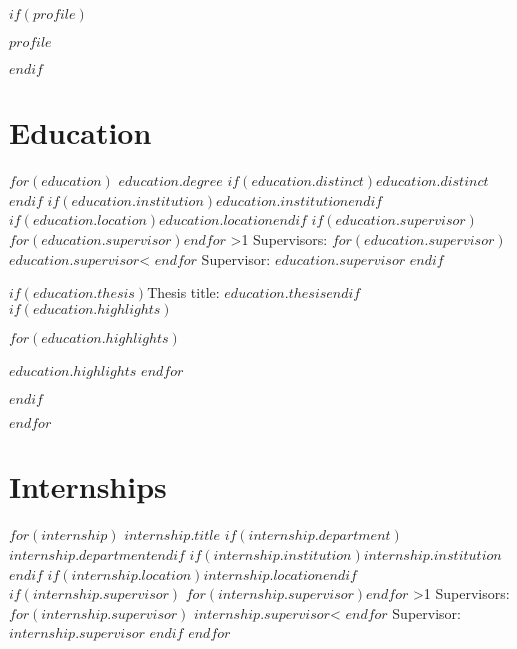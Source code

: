 \documentclass[]{deedy-resume-openfont}
\newcounter{counterA}
\newcounter{counterB}
\begin{document}
\lastupdated

$if(profile)$
\begin{minipage}[t]{\textwidth}
$profile$
\end{minipage}
\sectionsep
$endif$

\section{Education}
$for(education)$
%
{$education.degree$}%
{$if(education.distinct)$$education.distinct$$endif$}%
{$if(education.institution)$\emph{$education.institution$}$endif$}%
{$if(education.location)$$education.location$$endif$}%
{$if(education.supervisor)$%
\setcounter{counterA}{0}%
\setcounter{counterB}{0}%
\def\variable{0}
$for(education.supervisor)$$endfor$%
\ifnum\value{counterA}>1%
Supervisors: 
$for(education.supervisor)$%
%
$education.supervisor$\ifnum\value{counterB}<\value{counterA}\customsep\fi%
$endfor$%
\else%
Supervisor: $education.supervisor$%
\fi%
$endif$%
}%
{$if(education.thesis)$Thesis title: \textbf{$education.thesis$}$endif$
$if(education.highlights)$%
{\small%
\begin{tightemize}%
$for(education.highlights)$
\item $education.highlights$%
$endfor$
\end{tightemize}}%
$endif$%
}%
$endfor$
\sectionsep
\section{Internships}
$for(internship)$
%
{$internship.title$}%
{$if(internship.department)$$internship.department$$endif$}%
{$if(internship.institution)$\emph{$internship.institution$}$endif$}%
{$if(internship.location)$$internship.location$$endif$}%
{$if(internship.supervisor)$%
\setcounter{counterA}{0}%
\setcounter{counterB}{0}%
$for(internship.supervisor)$$endfor$%
\ifnum\value{counterA}>1%
Supervisors: 
$for(internship.supervisor)$%
%
$internship.supervisor$\ifnum\value{counterB}<\value{counterA}\customsep\fi%
$endfor$%
\else%
Supervisor: $internship.supervisor$%
\fi%
$endif$}%
{}%
$endfor$
\sectionsep
\end{document}
